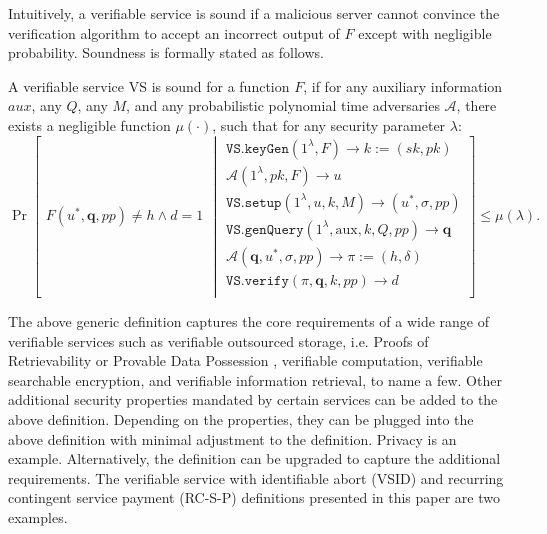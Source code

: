 Intuitively, a verifiable service is sound  if a malicious server cannot convince the verification algorithm to accept an incorrect output of $F$ except with negligible probability. %
Soundness is formally stated as follows.




\begin{definition}[VS Soundness] A verifiable service VS is sound  for a function $F$, if for any auxiliary information $aux$, any  $Q$,  any $M$, and any probabilistic polynomial time adversaries $\mathcal{A}$, there exists a negligible function $\mu(\cdot)$, such that for any security parameter $\lambda$: 
\small{
$$ \Pr\left[
  \begin{array}{l}
F(u^{\scriptscriptstyle *},\bm{q},{pp})\neq h \wedge d=1
\end{array} \middle | 
    \begin{array} {l}
 \mathtt{VS.keyGen}(1^{\lambda},F)\rightarrow k:=(sk,pk)\\
 \mathcal{A}(1^{\scriptscriptstyle\lambda},pk, F)\rightarrow u\\
\mathtt{VS.setup}(1^{\lambda}, u,k,M)\rightarrow (u^{\scriptscriptstyle *},\sigma, {pp})\\
 \mathtt{VS.genQuery}(1^{\lambda}, \text{aux},k,Q,{pp})\rightarrow \bm{q}\\
 \mathcal{A}(\bm{q},u^{\scriptscriptstyle *},\sigma,{pp})\rightarrow \pi:=(h,\delta)\\
 \mathtt{VS.verify}(\pi,\bm{q},k,{pp})\rightarrow d\\
\end{array}    \right]\leq \mu(\lambda).$$
}
\end{definition}




The above generic definition captures the core requirements of a wide range of verifiable services such as verifiable outsourced storage, i.e. Proofs of Retrievability \cite{DBLP:journals/iacr/JuelsK07,DBLP:conf/asiacrypt/ShachamW08} or Provable Data Possession \cite{DBLP:conf/ccs/AtenieseBCHKPS07,ShenT11}, verifiable computation, verifiable searchable encryption, and verifiable information retrieval, to name a few. Other additional  security properties mandated by certain services can be added to the above definition. Depending on the properties,  they can be  plugged into  the above definition with minimal adjustment to the definition. Privacy is an example. Alternatively, the definition can be upgraded to capture the  additional requirements.  The verifiable service with identifiable abort (VSID) and recurring contingent service payment (RC-S-P) definitions presented in this paper are two examples. 


